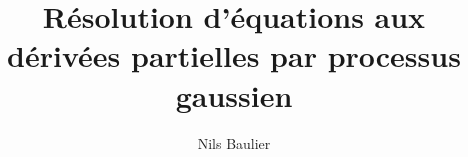 \documentclass{article}
\title{Résolution d'équations aux dérivées partielles par processus gaussien}
\author{Nils Baulier}
\date{}
\begin{document}
\maketitle{}
\end{document}
